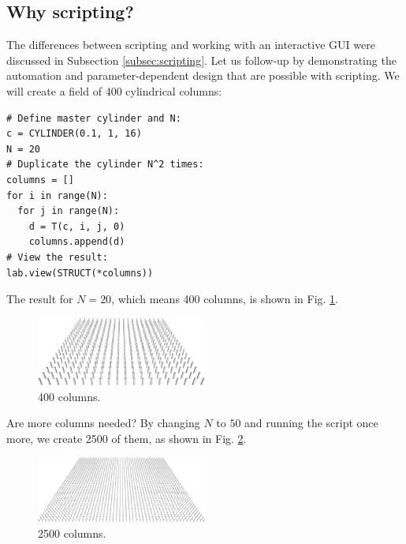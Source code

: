 \subsection{Why scripting?}

The differences between scripting and working with an interactive GUI 
were discussed in Subsection \ref{subsec:scripting}. Let us follow-up
by demonstrating the automation and parameter-dependent design that are 
possible with scripting. We will create a field of 400 cylindrical columns:\\

\begin{bbox}
\begin{verbatim}
# Define master cylinder and N:
c = CYLINDER(0.1, 1, 16)
N = 20
# Duplicate the cylinder N^2 times:
columns = []
for i in range(N):
  for j in range(N):
    d = T(c, i, j, 0)
    columns.append(d)
# View the result:
lab.view(STRUCT(*columns)) 
\end{verbatim}
\end{bbox}
\vspace{6mm}

\noindent
The result for $N = 20$, which means 400 columns, is shown 
in Fig. \ref{fig:400}.\\

\begin{figure}[!ht]
\begin{center}
\includegraphics[width=0.5\textwidth]{img/400.png}
\end{center}
\vspace{-4mm}
\caption{400 columns.}
\label{fig:400}
\end{figure}
\noindent
Are more columns needed? By changing $N$ to $50$ and running the script
once more, we create 2500 of them, as shown in Fig. \ref{fig:2500}.

\begin{figure}[!ht]
\begin{center}
\includegraphics[width=0.5\textwidth]{img/2500.png}
\end{center}
\vspace{-4mm}
\caption{2500 columns.}
\label{fig:2500}
\end{figure}
\noindent


